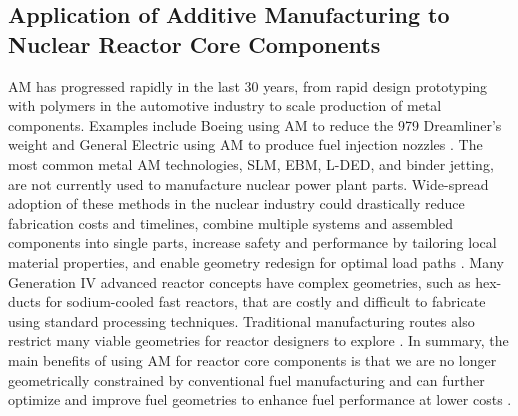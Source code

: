 \subsection{Application of Additive Manufacturing to Nuclear Reactor Core Components}
\label{sec:am}
\gls{AM} has progressed rapidly in the last 30 years, from rapid design prototyping 
with polymers in the automotive industry to scale production of metal components.  
Examples include Boeing using \gls{AM} to reduce the 979 Dreamliner's weight 
\cite{noauthor_printed_2017} and General Electric using \gls{AM} to produce fuel 
injection nozzles \cite{noauthor_transformation_2018}. 
The most common metal \gls{AM} technologies, \gls{SLM}, \gls{EBM}, \gls{L-DED}, 
and binder jetting, are not currently used to manufacture nuclear power plant parts. 
Wide-spread adoption of these methods in the nuclear industry could drastically 
reduce fabrication costs and timelines, combine multiple systems and assembled 
components into single parts, increase safety and performance by tailoring 
local material properties, and enable geometry redesign for optimal load paths 
\cite{simpson_considerations_2019}. 
Many Generation IV advanced reactor concepts have complex geometries, 
such as hex-ducts for sodium-cooled fast reactors, that are costly and difficult 
to fabricate using standard processing techniques. 
Traditional manufacturing routes also restrict many viable geometries for 
reactor designers to explore \cite{sridharan_performance_2019}. 
In summary, the main benefits of using \gls{AM} for reactor core components is that 
we are no longer geometrically constrained by conventional fuel manufacturing 
and can further optimize and improve fuel geometries to enhance fuel performance 
at lower costs \cite{bergeron_early_2018}. 

